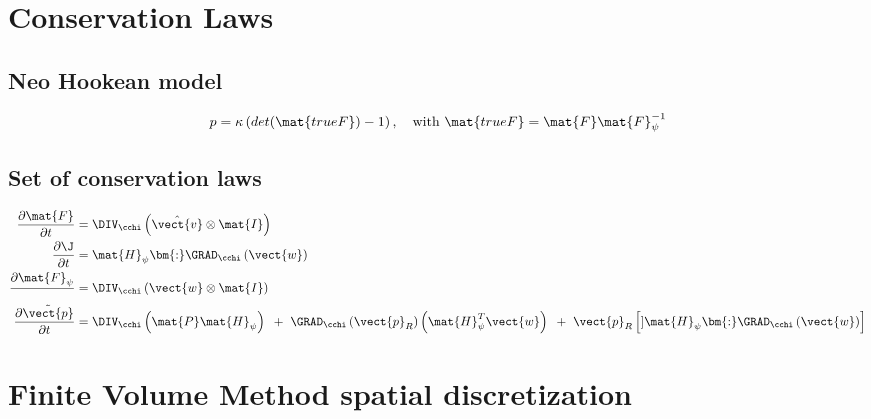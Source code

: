 \newpage
\section{Conservation Laws}
\subsection{Neo Hookean model}
\begin{equation}
	p = \kappa \left( det(\mat{trueF}) - 1 \right), \quad \textrm{with } \mat{trueF} = \mat{F} \mat{F}_{\psi}^{-1}
\end{equation}
\subsection{Set of conservation laws}
\begin{subequations}
\begin{align}
	\frac{\partial \mat{F}}{\partial t} &= \DIV_{\cchi}\left( \hat{\vect{v}} \otimes \mat{I} \right) \\ 
	\frac{\partial \J}{\partial t} &= \mat{H}_{\psi} \bm{:} \GRAD_{\cchi}\left( \vect{w} \right) \\
	\frac{\partial \mat{F}_{\psi}}{} &= \DIV_{\cchi}\left( \vect{w} \otimes \mat{I} \right) \\
	\frac{\partial \tilde{\vect{p}}}{\partial t} &= \DIV_{\cchi}\left( \mat{P}\mat{H}_{\psi}\right) {~}+{~} \GRAD_{\cchi} \left(  \vect{p}_R \right) \left( \mat{H}_{\psi}^{T}\vect{w} \right)  {~}+{~} \vect{p}_R \left[] \mat{H}_{\psi} \bm{:} \GRAD_{\cchi}\left( \vect{w} \right) \right]
\end{align}
\end{subequations}


\section{Finite Volume Method spatial discretization}
%
